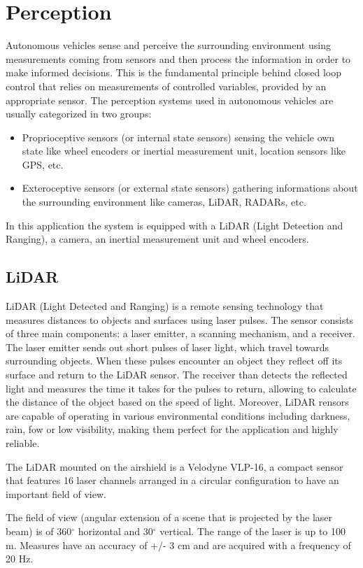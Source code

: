 \documentclass[a4paper,12pt,oneside]{book}
\begin{document}
\section{Perception}
Autonomous vehicles sense and perceive the surrounding environment using measurements coming from sensors and then process the information in order to make informed decisions. 
This is the fundamental principle behind closed loop control that relies on measurements of controlled variables, provided by an appropriate sensor.
The perception systems used in autonomous vehicles are usually categorized in two groups:
\begin{itemize}
    \item Proprioceptive sensors (or internal state sensors) sensing the vehicle own state like wheel encoders or inertial measurement unit, location sensors like GPS, etc.
    \item Exteroceptive sensors (or external state sensors) gathering informations about the surrounding environment like cameras, LiDAR, RADARs, etc.
\end{itemize}
In this application the system is equipped with a LiDAR (Light Detection and Ranging), a camera, an inertial measurement unit and wheel encoders.

\subsection*{LiDAR}
LiDAR (Light Detected and Ranging) is a remote sensing technology that measures distances to objects and surfaces using laser pulses. 
The sensor consists of three main components: a laser emitter, a scanning mechanism, and a receiver.
The laser emitter sends out short pulses of laser light, which travel towards surrounding objects. 
When these pulses encounter an object they reflect off its surface and return to the LiDAR sensor.
The receiver than detects the reflected light and measures the time it takes for the pulses to return, allowing to calculate the distance of the object based on the speed of light.
Moreover, LiDAR rensors are capable of operating in various environmental conditions including darkness, rain, fow or low visibility, making them perfect for the application and highly reliable.

The LiDAR mounted on the airshield is a Velodyne VLP-16, a compact sensor that features 16 laser channels arranged in a circular configuration to have an important field of view.

The field of view (angular extension of a scene that is projected by the laser beam) is of 360$^\circ$ horizontal and 30$^\circ$ vertical.
The range of the laser is up to 100 m. 
Measures have an accuracy of +/- 3 cm and are acquired with a frequency of 20 Hz.
\end{document}

